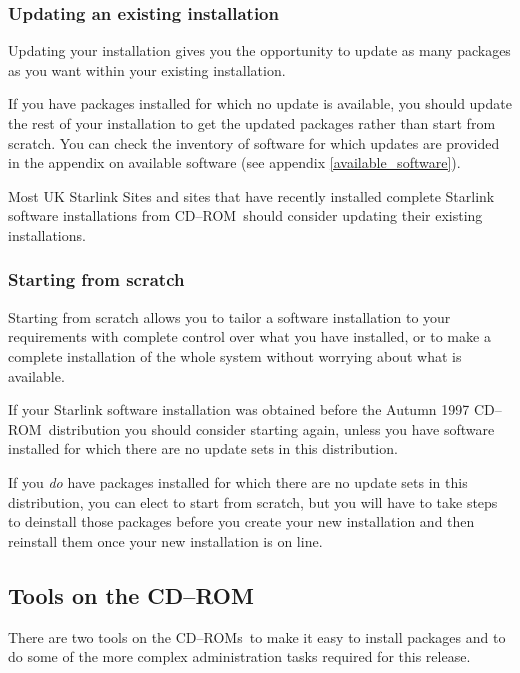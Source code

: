 \documentclass[twoside,11pt]{article}
\newcommand{\htmlref}[2]{#1}
\newcommand{\latex}[1]{#1}
\newcommand{\xlabel}[1]{}
\renewcommand{\_}{\texttt{\symbol{95}}}
\newcommand{\cdrom}{CD--ROM}
\newcommand{\cdrom}{CD-ROM}
\newcommand{\cdroms}{CD--ROMs}
\newcommand{\cdroms}{CD-ROMs}
\begin{document}
\subsubsection{Updating an existing installation}

Updating your installation gives you the opportunity to update as many
packages as you want within your existing installation.

If you have packages installed for which no update is available, you
should update the rest of your installation to get the updated packages
rather than start from scratch.  You can check the inventory of software
for which updates are provided in the appendix on
\htmlref{available software}{available_software} \latex{(see appendix
\ref{available_software})}.

Most UK Starlink Sites and sites that have recently installed complete
Starlink software installations from \cdrom\ should consider updating
their existing installations.

\subsubsection{\xlabel{starting_from_scratch}Starting from scratch}
\label{starting_from_scratch}

Starting from scratch allows you to tailor a software installation to your
requirements with complete control over what you have installed, or to
make a complete installation of the whole system without worrying about what
is available.

If your Starlink software installation was obtained before the Autumn
1997 \cdrom\ distribution you should consider starting again, unless
you have software installed for which there are no update sets in this
distribution.

If you \emph{do} have packages installed for which there are no
update sets in this distribution, you can elect to start from scratch,
but you will have to take steps to deinstall those packages before you
create your new installation and then reinstall them once your new
installation is on line.

\subsection{\xlabel{tools_on_the_cdrom}Tools on the \cdrom}
\label{tools_on_the_cdrom}

There are two tools on the \cdroms\ to make it easy to install packages
and to do some of the more complex administration tasks required for
this release.
\end{document}
